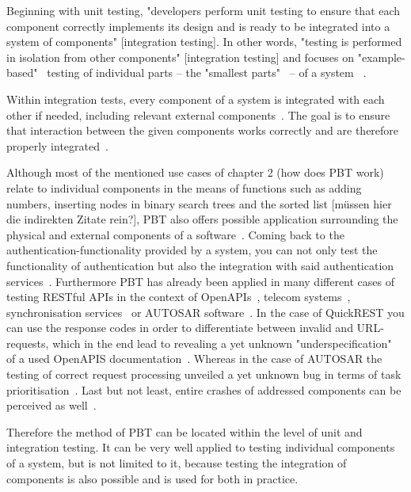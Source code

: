 \documentclass[runningheads]{llncs}
\begin{document}
Beginning with unit testing, "developers perform unit testing to ensure that each component correctly implements its design and is ready to be integrated into a system of components" [integration testing]. In other words, "testing is performed in isolation from other components" [integration testing] and focuses on "example-based"~\cite{Corgozinho2023} testing of individual parts -- the "smallest parts"~\cite{Aniche2022} -- of a system ~\cite{Hartmann2000,Corgozinho2023}.

Within integration tests, every component of a system is integrated with each other if needed, including relevant external components~\cite{Aniche2022,Hartmann2000,Radziwill2020}. The goal is to ensure that interaction between the given components works correctly and are therefore properly integrated~\cite{Hartmann2000,Aniche2022}.

Although most of the mentioned use cases of chapter 2 (how does PBT work) relate to individual components in the means of functions such as adding numbers, inserting nodes in binary search trees and the sorted list [müssen hier die indirekten Zitate rein?], PBT also offers possible application surrounding the physical and external components of a software~\cite{Chen2022}. Coming back to the authentication-functionality provided by a system, you can not only test the functionality of authentication but also the integration with said authentication services~\cite{Fink1997}. Furthermore PBT has already been applied in many different cases of testing RESTful APIs in the context of OpenAPIs~\cite{Karlsson2019}, telecom systems~\cite{Arts2006}, synchronisation services~\cite{Hughes2016} or AUTOSAR software~\cite{Arts2015}. In the case of QuickREST you can use the response codes in order to differentiate between invalid and URL-requests, which in the end lead to revealing a yet unknown "underspecification"~\cite{Karlsson2019} of a used OpenAPIS documentation~\cite{Karlsson2019}. Whereas in the case of AUTOSAR the testing of correct request processing unveiled a yet unknown bug in terms of task prioritisation~\cite{Arts2015}. Last but not least, entire crashes of addressed components can be perceived as well~\cite{Arts2006}.
 
Therefore the method of PBT can be located within the level of unit and  integration testing. It can be very well applied to testing individual components of a system, but is not limited to it, because testing the integration of components is also possible and is used for both in practice.
\end{document}
